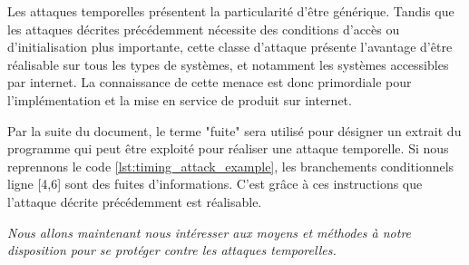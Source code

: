Les attaques temporelles présentent la particularité d'être générique. Tandis que les attaques décrites précédemment nécessite des conditions d'accès ou d'initialisation plus importante, cette classe d'attaque présente l'avantage d'être réalisable sur tous les types de systèmes, et notamment les systèmes accessibles par internet. La connaissance de cette menace est donc primordiale pour l'implémentation et la mise en service de produit sur internet.\medbreak

Par la suite du document, le terme "fuite" sera utilisé pour désigner un extrait du programme qui peut être exploité pour réaliser une attaque temporelle. Si nous reprennons le code \ref{lst:timing_attack_example}, les branchements conditionnels ligne [4,6] sont des fuites d'informations. C'est grâce à ces instructions que l'attaque décrite précédemment est réalisable.\medbreak

\raggedbottom
\textit{Nous allons maintenant nous intéresser aux moyens et méthodes à notre disposition pour se protéger contre les attaques temporelles.}



